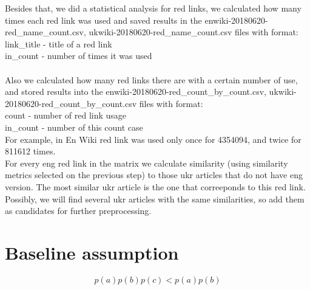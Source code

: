 \documentclass[11pt,a4paper]{article}
\begin{document}
Besides that, we did a statistical analysis for red links, we calculated how many times each red link was used and saved results in the enwiki-20180620-red\_name\_count.csv, ukwiki-20180620-red\_name\_count.csv files with format:\\
link\_title - title of a red link\\
in\_count - number of times it was used\\
\\
Also we calculated how many red links there are with a certain number of use, and stored results into the enwiki-20180620-red\_count\_by\_count.csv, ukwiki-20180620-red\_count\_by\_count.csv files with format:\\
count - number of red link usage\\
in\_count - number of this count case\\

For example, in En Wiki red link was used only once for 4354094, and twice for 811612 times.\\

For every eng red link in the matrix we calculate similarity (using similarity metrics selected on the previous step) to those ukr articles that do not have eng version. The most similar ukr article is the one that correeponds to this red link. Possibly, we will find several ukr articles with the same similarities, so add them as candidates for further preprocessing.

\section{Baseline assumption}

\[ p(a)p(b)p(c) < p(a)p(b) \]



\end{document}
